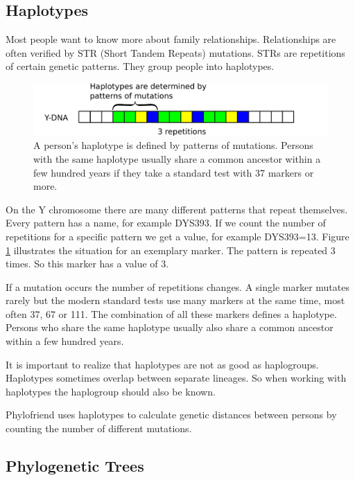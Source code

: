\subsection{Haplotypes}

Most people want to know more about family relationships.
Relationships are often verified by STR (Short Tandem
Repeats) mutations. STRs are repetitions of certain
genetic patterns. They group people into haplotypes.

\begin{figure}[ht]
\centering
\includegraphics[width=13cm]{img/haplotypes.png}
\caption{\label{haplotype} A person's haplotype is defined
by patterns of mutations. Persons with the same haplotype
usually share a common ancestor within a few hundred years
if they take a standard test with 37 markers or more.}
\end{figure}

On the Y chromosome there are many different patterns that
repeat themselves. Every pattern has a name, for example DYS393.
If we count the number of repetitions for a specific pattern
we get a value, for example DYS393=13. Figure \ref{haplotype}
illustrates the situation for an exemplary marker. The pattern
is repeated 3 times. So this marker has a value of 3.

If a mutation occurs the number of repetitions changes. A 
single marker mutates rarely but the modern standard tests
use many markers at the same time, most often 37, 67 or
111. The combination of all these markers defines
a haplotype. Persons who share the same haplotype usually
also share a common ancestor within a few hundred years.

It is important to realize that haplotypes are not as good
as haplogroups. Haplotypes sometimes overlap between separate
lineages. So when working with haplotypes the haplogroup
should also be known.

Phylofriend uses haplotypes to calculate genetic distances
between persons by counting the number of different mutations.


\subsection{Phylogenetic Trees}

